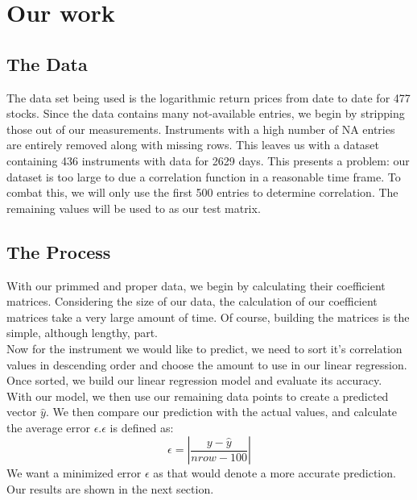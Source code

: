 \documentclass[10pt]{siamltex}
\begin{document}
\vspace{5mm}

\section{Our work}    \label{sec:ourWork}
\subsection{The Data}

The data set being used is the logarithmic return prices from date to date for 477 stocks. Since the data contains many not-available entries, we begin by stripping those out of our measurements. Instruments with a high number of NA entries are entirely removed along with missing rows. This leaves us with a dataset containing 436 instruments with data for 2629 days. This presents a problem: our dataset is too large to due a correlation function in a reasonable time frame. To combat this, we will only use the first 500 entries to determine correlation. The remaining values will be used to as our test matrix.

\subsection{The Process}
With our primmed and proper data, we begin by calculating their coefficient matrices. Considering the size of our data, the calculation of our coefficient matrices take a very large amount of time. 
Of course, building the matrices is the simple, although lengthy, part. \vspace{5mm}\\
Now for the instrument we would like to predict, we need to sort it's correlation values in descending order and choose the amount to use in our linear regression. Once sorted, we build our linear regression model and evaluate its accuracy.\vspace{5mm} \\
With our model, we then use our remaining data points to create a predicted vector $\hat{y}$. We then compare our prediction with the actual values, and calculate the average error $\epsilon$.$\epsilon$ is defined as:
\begin{equation}
\epsilon = |\frac{y - \hat{y}}{nrow - 100}|
\end{equation}
We want a minimized error $\epsilon$ as that would denote a more accurate prediction. Our results are shown in the next section.
\newpage
\end{document}
